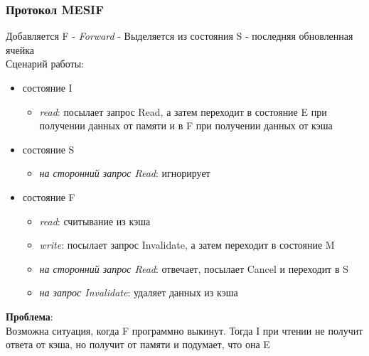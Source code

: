 \documentclass[12pt]{article}
\begin{document}
\subsubsection{Протокол MESIF}
Добавляется F - \textit{Forward} - Выделяется из состояния S - последняя обновленная ячейка\\
Сценарий работы:
\begin{itemize}
    \item состояние I
    \begin{itemize}
        \item \textit{read}: посылает запрос Read, а затем переходит в состояние E при получении данных от памяти и в F при получении данных от кэша
    \end{itemize}
    \item состояние S
    \begin{itemize}
        \item \textit{на сторонний запрос Read}: игнорирует
    \end{itemize}
    \item состояние F
    \begin{itemize}
        \item \textit{read}: считывание из кэша
        \item \textit{write}: посылает запрос Invalidate, а затем переходит в состояние M
        \item \textit{на сторонний запрос Read}: отвечает, посылает Cancel и переходит в S
        \item \textit{на запрос Invalidate}: удаляет данных из кэша
    \end{itemize}
\end{itemize}
\textbf{Проблема}:\\
Возможна ситуация, когда F программно выкинут. Тогда I при чтении не получит ответа от кэша, но получит от памяти и подумает, что она E
\end{document}
